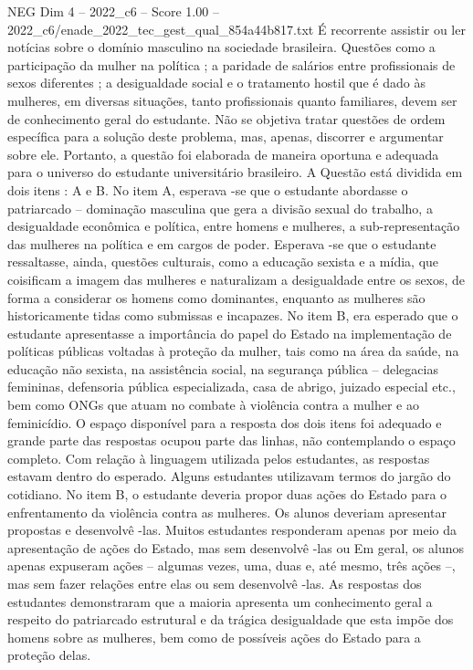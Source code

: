 \begin{textsample}{NEG Dim 4 – 2022\_c6 – Score 1.00 – 2022\_c6/enade\_2022\_tec\_gest\_qual\_854a44b817.txt}
É recorrente assistir ou ler notícias sobre o domínio masculino na sociedade brasileira.
Questões como a participação da mulher na política ; a paridade de salários entre profissionais de sexos diferentes ; a desigualdade social e o tratamento hostil que é dado às mulheres, em diversas situações, tanto profissionais quanto familiares, devem ser de conhecimento geral do estudante.
Não se objetiva tratar questões de ordem específica para a solução deste problema, mas, apenas, discorrer e argumentar sobre ele.
Portanto, a questão foi elaborada de maneira oportuna e adequada para o universo do estudante universitário brasileiro.
A Questão está dividida em dois itens : A e B.
No item A, esperava -se que o estudante abordasse o patriarcado – dominação masculina que gera a divisão sexual do trabalho, a desigualdade econômica e política, entre homens e mulheres, a sub-representação das mulheres na política e em cargos de poder.
Esperava -se que o estudante ressaltasse, ainda, questões culturais, como a educação sexista e a mídia, que coisificam a imagem das mulheres e naturalizam a desigualdade entre os sexos, de forma a considerar os homens como dominantes, enquanto as mulheres são historicamente tidas como submissas e incapazes.
No item B, era esperado que o estudante apresentasse a importância do papel do Estado na implementação de políticas públicas voltadas à proteção da mulher, tais como na área da saúde, na educação não sexista, na assistência social, na segurança pública – delegacias femininas, defensoria pública especializada, casa de abrigo, juizado especial etc., bem como ONGs que atuam no combate à violência contra a mulher e ao feminicídio.
O espaço disponível para a resposta dos dois itens foi adequado e grande parte das respostas ocupou parte das linhas, não contemplando o espaço completo.
Com relação à linguagem utilizada pelos estudantes, as respostas estavam dentro do esperado.
Alguns estudantes utilizavam termos do jargão do cotidiano.
No item B, o estudante deveria propor duas ações do Estado para o enfrentamento da violência contra as mulheres.
Os alunos deveriam apresentar propostas e desenvolvê -las.
Muitos estudantes responderam apenas por meio da apresentação de ações do Estado, mas sem desenvolvê -las ou Em geral, os alunos apenas expuseram ações – algumas vezes, uma, duas e, até mesmo, três ações –, mas sem fazer relações entre elas ou sem desenvolvê -las.
As respostas dos estudantes demonstraram que a maioria apresenta um conhecimento geral a respeito do patriarcado estrutural e da trágica desigualdade que esta impõe dos homens sobre as mulheres, bem como de possíveis ações do Estado para a proteção delas.

\end{textsample}
